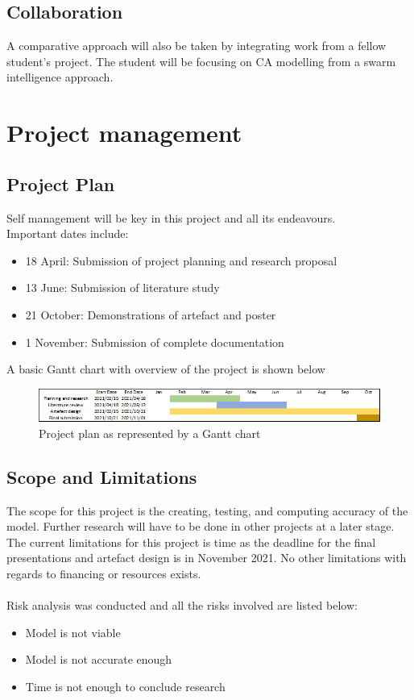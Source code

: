 \subsection{Collaboration}
A comparative approach will also be taken by integrating work from a fellow student's project. The student will be focusing on CA modelling from a swarm intelligence approach.
\section{Project management}
\subsection{Project Plan}
Self management will be key in this project and all its endeavours.\\
Important dates include:
\begin{itemize}
\item 18 April: Submission of project planning and research proposal
\item 13 June: Submission of literature study          
\item 21 October: Demonstrations of artefact and poster          
\item 1 November: Submission of complete documentation 
\end{itemize}
A basic Gantt chart with overview of the project is shown below
\begin{figure}[H]
\centering
\includegraphics[scale=0.8]{Figures/Chart.png}
\caption{Project plan as represented by a Gantt chart}
\label{fig:fig1}
\end{figure}
\subsection{Scope and Limitations}
The scope for this project is the creating, testing, and computing accuracy of the model. Further research will have to be done in other projects at a later stage. The current limitations for this project is time as the deadline for the final presentations and artefact design is in November 2021. No other limitations with regards to financing or resources exists.\\\\
Risk analysis was conducted and all the risks involved are listed below:
\begin{itemize}
\item Model is not viable
\item Model is not accurate enough
\item Time is not enough to conclude research
\end{itemize}
